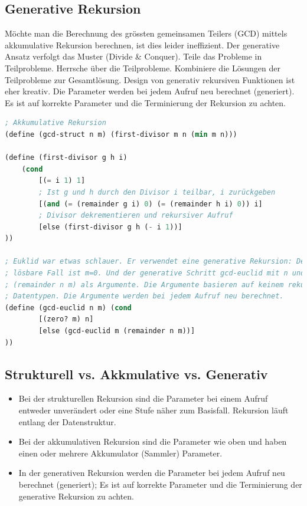\subsection{Generative Rekursion}
Möchte man die Berechnung des grössten gemeinsamen Teilers (GCD) mittels akkumulative Rekursion berechnen, ist dies leider ineffizient. Der generative Ansatz verfolgt das Muster (Divide \& Conquer). Teile das Probleme in Teilprobleme. Herrsche über die Teilprobleme. Kombiniere die Lösungen der Teilprobleme zur Gesamtlösung. Design von generativ rekursiven Funktionen ist eher kreativ. Die Parameter werden bei jedem Aufruf neu berechnet (generiert). Es ist auf korrekte Parameter und die Terminierung der Rekursion zu achten.

\begin{lstlisting}[language=Lisp, caption=Generative Rekursion - Beispiel GCD]
; Akkumulative Rekursion
(define (gcd-struct n m) (first-divisor m n (min m n)))
	
(define (first-divisor g h i)
	(cond
		[(= i 1) 1]
		; Ist g und h durch den Divisor i teilbar, i zurückgeben
		[(and (= (remainder g i) 0) (= (remainder h i) 0)) i]
		; Divisor dekrementieren und rekursiver Aufruf
		[else (first-divisor g h (- i 1))]
))

; Euklid war etwas schlauer. Er verwendet eine generative Rekursion: Der trivial 
; lösbare Fall ist m=0. Und der generative Schritt gcd-euclid mit n und 
; (remainder n m) als Argumente. Die Argumente basieren auf keinem rekurisven 
; Datentypen. Die Argumente werden bei jedem Aufruf neu berechnet.
(define (gcd-euclid n m) (cond
		[(zero? m) n]
		[else (gcd-euclid m (remainder n m))]
))
\end{lstlisting}

\subsection{Strukturell vs. Akkmulative vs. Generativ}

\begin{itemize}
	\item Bei der strukturellen Rekursion sind die Parameter bei einem Aufruf entweder unverändert oder eine Stufe näher zum Basisfall. Rekursion läuft entlang der Datenstruktur.
	\item Bei der akkumulativen Rekursion sind die Parameter wie oben und haben einen oder mehrere Akkumulator (Sammler) Parameter.
	\item In der generativen Rekursion werden die Parameter bei jedem Aufruf neu berechnet (generiert); Es ist auf  korrekte Parameter und die Terminierung der generative Rekursion zu achten.
\end{itemize}

